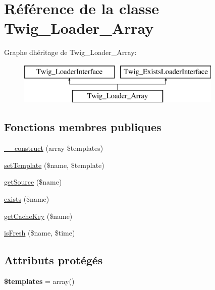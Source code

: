 \hypertarget{class_twig___loader___array}{}\section{Référence de la classe Twig\+\_\+\+Loader\+\_\+\+Array}
\label{class_twig___loader___array}
Graphe d\textquotesingle{}héritage de Twig\+\_\+\+Loader\+\_\+\+Array\+:\begin{figure}[H]
\begin{center}
\leavevmode
\includegraphics[height=2.000000cm]{class_twig___loader___array}
\end{center}
\end{figure}
\subsection*{Fonctions membres publiques}
\begin{DoxyCompactItemize}
\item 
\hyperlink{class_twig___loader___array_a3f09285538f6055294690bfb6110b3e9}{\+\_\+\+\_\+construct} (array \$templates)
\item 
\hyperlink{class_twig___loader___array_aac414f998f58d0487c0ccec6a5af5ecb}{set\+Template} (\$name, \$template)
\item 
\hyperlink{class_twig___loader___array_a8c6017d8ed0800a8d6b201883fcfb4bd}{get\+Source} (\$name)
\item 
\hyperlink{class_twig___loader___array_a0909de156d39accf2e3c52f4bce3765f}{exists} (\$name)
\item 
\hyperlink{class_twig___loader___array_aaf1587bcc7c8f06e87be6ccaf76fb6ea}{get\+Cache\+Key} (\$name)
\item 
\hyperlink{class_twig___loader___array_a3ee0419b212dc4f6f1e8a5a615423ad8}{is\+Fresh} (\$name, \$time)
\end{DoxyCompactItemize}
\subsection*{Attributs protégés}
\begin{DoxyCompactItemize}
\item 
{\bfseries \$templates} = array()\hypertarget{class_twig___loader___array_a3326a7f5703016042df69801c9770b4c}{}\label{class_twig___loader___array_a3326a7f5703016042df69801c9770b4c}

\end{DoxyCompactItemize}


